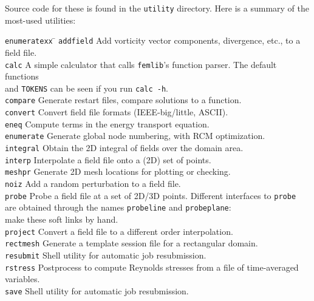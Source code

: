 \documentclass[11pt]{report}
\begin{document}
Source code for these is found in the \texttt{utility} directory.
Here is a summary of the most-used utilities:
\begin{tabbing}
\texttt{enumeratexx}  \= \kill
\texttt{addfield} \>   
        Add vorticity vector components, divergence, etc., to a field
	file.\\
\texttt{calc} \>      
        A simple calculator that calls \verb+femlib+'s function
        parser. The default functions\\\>and \texttt{TOKENS} can be seen
        if you run \texttt{calc -h}.\\
\texttt{compare} \>   
        Generate restart files, compare solutions to a function.\\
\texttt{convert} \>   
        Convert field file formats (IEEE-big/little, ASCII).\\
\texttt{eneq} \>   
        Compute terms in the energy transport equation.\\
\texttt{enumerate}  \>
        Generate global node numbering, with RCM optimization.\\
\texttt{integral} \> Obtain the 2D integral of fields over the
        domain area.\\
\texttt{interp} \>   
        Interpolate a field file onto a (2D) set of points.\\
\texttt{meshpr} \>    
        Generate 2D mesh locations for plotting or checking.\\
\texttt{noiz} \>      
        Add a random perturbation to a field file.\\
\texttt{probe} \>   
        Probe a field file at a set of 2D/3D points. Different
        interfaces to \texttt{probe}\\ \> are obtained through the names
        \texttt{probeline} and \texttt{probeplane}: \\ \> make these soft
        links by hand.\\
\texttt{project} \>   
        Convert a field file to a different order interpolation.\\
\texttt{rectmesh} \>
        Generate a template session file for a rectangular domain.\\
\texttt{resubmit} \> Shell utility for automatic job resubmission.\\
\texttt{rstress} \>
	Postprocess to compute Reynolds stresses from a file of
        time-averaged variables.\\
\texttt{save} \> Shell utility for automatic job resubmission.\\

\end{tabbing}
\end{document}
